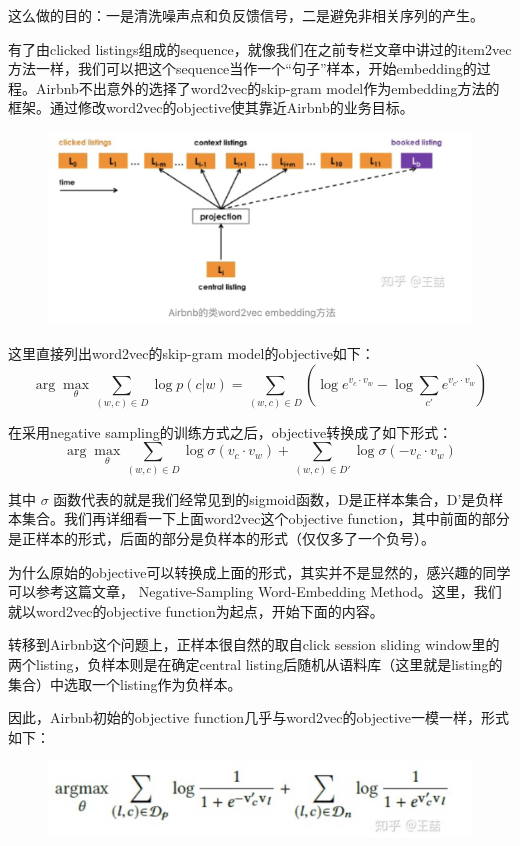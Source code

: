 \documentclass[12pt]{article}
\begin{document}
这么做的目的：一是清洗噪声点和负反馈信号，二是避免非相关序列的产生。

有了由clicked listings组成的sequence，就像我们在之前专栏文章中讲过的item2vec方法一样，我们可以把这个sequence当作一个“句子”样本，开始embedding的过程。Airbnb不出意外的选择了word2vec的skip-gram model作为embedding方法的框架。通过修改word2vec的objective使其靠近Airbnb的业务目标。
\begin{figure}[H]
    \centering
    \includegraphics[width=1\textwidth]{fig/Airbnb_Word2Vec_Embedding_For_Session.png}
\end{figure}

这里直接列出word2vec的skip-gram model的objective如下：
$$
\arg\max_\theta \sum_{(w,c) \in D} \log{p(c|w)} = \sum_{(w,c) \in D}(\log{e^{v_c \cdot v_w}} - \log{\sum_{c'}e^{v_{c'} \cdot v_w}})
$$


在采用negative sampling的训练方式之后，objective转换成了如下形式：
$$
\arg\max_\theta \sum_{(w,c) \in D} \log{\sigma(v_c \cdot v_w)} +  \sum_{(w,c) \in D'}\log{\sigma(-v_c \cdot v_w)}
$$

其中 $\sigma$ 函数代表的就是我们经常见到的sigmoid函数，D是正样本集合，D'是负样本集合。我们再详细看一下上面word2vec这个objective function，其中前面的部分是正样本的形式，后面的部分是负样本的形式（仅仅多了一个负号）。

为什么原始的objective可以转换成上面的形式，其实并不是显然的，感兴趣的同学可以参考这篇文章， Negative-Sampling Word-Embedding Method。这里，我们就以word2vec的objective function为起点，开始下面的内容。

转移到Airbnb这个问题上，正样本很自然的取自click session sliding window里的两个listing，负样本则是在确定central listing后随机从语料库（这里就是listing的集合）中选取一个listing作为负样本。

因此，Airbnb初始的objective function几乎与word2vec的objective一模一样，形式如下：
\begin{figure}[H]
    \centering
    \includegraphics[width=1\textwidth]{fig/Airbnb_Click_Objetive.png}
\end{figure}
\end{document}
